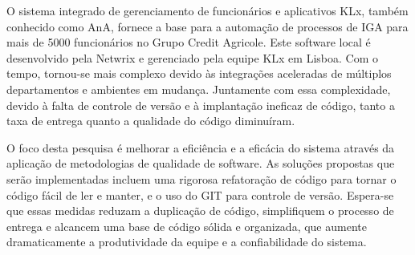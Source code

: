 
%

O sistema integrado de gerenciamento de funcionários e aplicativos KLx, também conhecido como AnA, fornece a base para a automação de processos de IGA para mais de 5000 funcionários no Grupo Credit Agricole. Este software local é desenvolvido pela Netwrix e gerenciado pela equipe KLx em Lisboa. Com o tempo, tornou-se mais complexo devido às integrações aceleradas de múltiplos departamentos e ambientes em mudança. Juntamente com essa complexidade, devido à falta de controle de versão e à implantação ineficaz de código, tanto a taxa de entrega quanto a qualidade do código diminuíram.

O foco desta pesquisa é melhorar a eficiência e a eficácia do sistema através da aplicação de metodologias de qualidade de software. As soluções propostas que serão implementadas incluem uma rigorosa refatoração de código para tornar o código fácil de ler e manter, e o uso do GIT para controle de versão. Espera-se que essas medidas reduzam a duplicação de código, simplifiquem o processo de entrega e alcancem uma base de código sólida e organizada, que aumente dramaticamente a produtividade da equipe e a confiabilidade do sistema.

